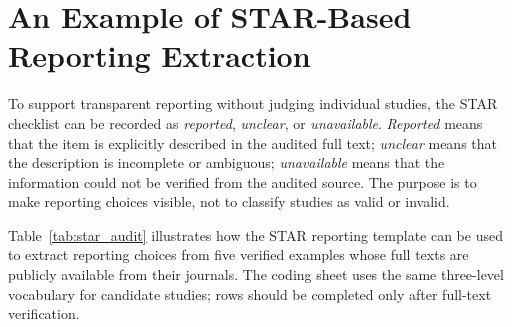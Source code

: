 \documentclass[pdflatex,sn-mathphys-num]{sn-jnl}
\begin{document}
\appendix
\section{An Example of STAR-Based Reporting Extraction}
To support transparent reporting without judging individual studies, the STAR checklist can be recorded as \emph{reported}, \emph{unclear}, or \emph{unavailable}. \emph{Reported} means that the item is explicitly described in the audited full text; \emph{unclear} means that the description is incomplete or ambiguous; \emph{unavailable} means that the information could not be verified from the audited source. The purpose is to make reporting choices visible, not to classify studies as valid or invalid.

Table~\ref{tab:star_audit} illustrates how the STAR reporting template can be used to extract reporting choices from five verified examples whose full texts are publicly available from their journals. The coding sheet uses the same three-level vocabulary for candidate studies; rows should be completed only after full-text verification.

\begin{table}[t]
\centering
\caption{Illustrative STAR-based reporting extraction. Entries record what can be verified from the audited full texts and are not correctness judgments.}
\label{tab:star_audit}
\small
{}
\end{table}
\end{document}
